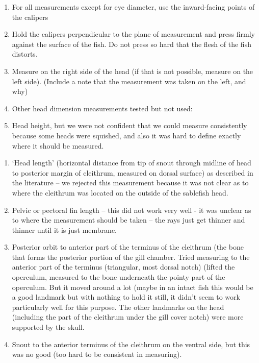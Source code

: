 \documentclass[12pt]{article}\usepackage[]{graphicx}\usepackage[]{color}
\begin{document}
\begin{enumerate}
\def\labelenumi{\alph{enumi}.}
\item
  For all measurements except for eye diameter, use the inward-facing points of the calipers
\item
  Hold the calipers perpendicular to the plane of measurement and press firmly against the surface of the fish. Do not press so hard that the flesh of the fish distorts.
\item
  Measure on the right side of the head (if that is not possible, measure on the left side). (Include a note that the measurement was taken on the left, and why)
\item
  Other head dimension measurements tested but not used:
\item
  Head height, but we were not confident that we could measure consistently because some heads were squished, and also it was hard to define exactly where it should be measured.
\end{enumerate}
\begin{enumerate}
\def\labelenumi{\roman{enumi}.}
\setcounter{enumi}{1}

\item
  `Head length' (horizontal distance from tip of snout through midline of head to posterior margin of cleithrum, measured on dorsal surface) as described in the literature -- we rejected this measurement because it was not clear as to where the cleithrum was located on the outside of the sablefish head.
\item
  Pelvic or pectoral fin length -- this did not work very well - it was unclear as to where the measurement should be taken -- the rays just get thinner and thinner until it is just membrane.
\item
  Posterior orbit to anterior part of the terminus of the cleithrum (the bone that forms the posterior portion of the gill chamber. Tried measuring to the anterior part of the terminus (triangular, most dorsal notch) (lifted the operculum, measured to the bone underneath the pointy part of the operculum. But it moved around a lot (maybe in an intact fish this would be a good landmark but with nothing to hold it still, it didn't seem to work particularly well for this purpose. The other landmarks on the head (including the part of the cleithrum under the gill cover notch) were more supported by the skull.
\item
  Snout to the anterior terminus of the cleithrum on the ventral side, but this was no good (too hard to be consistent in measuring).
\end{enumerate}
\end{document}
